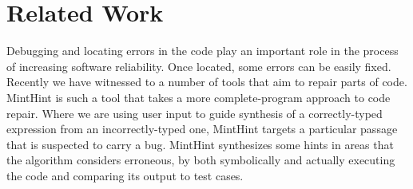 \section{Related Work}
\label{sec:related}

Debugging and locating errors in the code \cite{Pavlinovic:2014,
  Chandra:2011:AD} play an important role in the process of increasing
software reliability. Once located, some errors can be easily
fixed. Recently we have witnessed to a number of tools that aim to
repair parts of code. MintHint \cite{MintHint} is such a tool that
takes a more complete-program approach to code repair. Where we are
using user input to guide synthesis of a correctly-typed expression
from an incorrectly-typed one, MintHint targets a particular passage
that is suspected to carry a bug. MintHint synthesizes some hints in
areas that the algorithm considers erroneous, by both symbolically and
actually executing the code and comparing its output to test cases.

